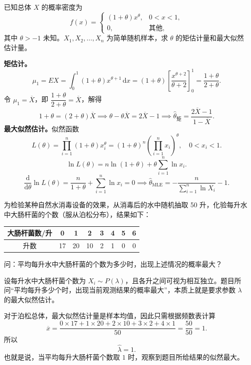﻿\documentclass[lang=cn,11pt]{elegantbook}
\begin{document}
\begin{exercise}[矩估计与最大似然估计] \label{ex:est_02}
已知总体 \(X\) 的概率密度为
\[
f(x)=
\begin{cases}
(1+\theta)x^\theta, & 0<x<1,\\
0, & \text{其他},
\end{cases}
\]
其中 \(\theta>-1\) 未知。\(X_1,X_2,\dots,X_n\) 为简单随机样本，求 \(\theta\) 的矩估计量和最大似然估计量。
\end{exercise}
\begin{solution}
\textbf{矩估计。}
\[
\mu_1=EX=\int_0^1(1+\theta)x^{\theta+1}\,\mathrm{d}x=(1+\theta)\left[\frac{x^{\theta+2}}{\theta+2}\right]_0^1=\frac{1+\theta}{2+\theta}.
\]
令 \(\mu_1=\overline{X}\)，即 \(\dfrac{1+\theta}{2+\theta}=\overline{X}\)，解得
\[
1+\theta=(2+\theta)\overline{X}\implies \theta-\theta\overline{X}=2\overline{X}-1\implies \hat{\theta}_{\text{矩}}=\frac{2\overline{X}-1}{1-\overline{X}}.
\]
\textbf{最大似然估计。}似然函数
\[
L(\theta)=\prod_{i=1}^{n}(1+\theta)x_i^\theta=(1+\theta)^n\left(\prod_{i=1}^{n}x_i\right)^{\!\theta},\quad 0<x_i<1.
\]
\[
\ln L(\theta)=n\ln(1+\theta)+\theta\sum_{i=1}^{n}\ln x_i.
\]
\[
\frac{\mathrm{d}}{\mathrm{d}\theta}\ln L(\theta)=\frac{n}{1+\theta}+\sum_{i=1}^{n}\ln x_i=0
\implies \hat{\theta}_{\text{MLE}}=-\frac{n}{\displaystyle\sum_{i=1}^{n}\ln X_i}-1.
\]
\end{solution}


\begin{exercise}\label{exer:7-poisson-bacteria}
为检验某种自然水消毒设备的效果，从消毒后的水中随机抽取 50 升，化验每升水中大肠杆菌的个数（服从泊松分布），结果如下：
\begin{center}
\begin{tabular}{c|ccccccc}
大肠杆菌数/升 & 0 & 1 & 2 & 3 & 4 & 5 & 6 \\
\hline
升数 & 17 & 20 & 10 & 2 & 1 & 0 & 0
\end{tabular}
\end{center}
问：平均每升水中大肠杆菌的个数为多少时，出现上述情况的概率最大？
\end{exercise}
\begin{solution}
设每升水中大肠杆菌个数为 \(X_i\sim P(\lambda)\)，且各升之间可视为相互独立。题目所问“平均每升多少个时，出现当前观测结果的概率最大”，本质上就是要求参数 \(\lambda\) 的最大似然估计。

对于泊松总体，最大似然估计量是样本均值，因此只需根据频数表计算
\[
\overline{x} = \frac{0\times17+1\times20+2\times10+3\times2+4\times1}{50} = \frac{50}{50} = 1.
\]
所以
\[
\hat{\lambda}=1.
\]
也就是说，当平均每升大肠杆菌个数取 \(1\) 时，观察到题目所给结果的似然最大。
\end{solution}
\end{document}
